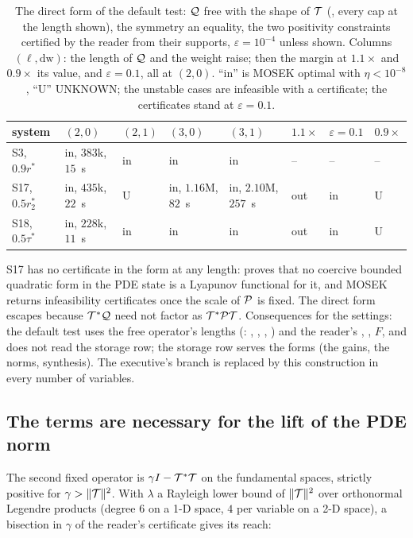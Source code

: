 \begin{table}[h]\centering\scriptsize
\setlength{\tabcolsep}{3pt}
\begin{tabular}{llllllll}
\toprule
system & $(2,0)$ & $(2,1)$ & $(3,0)$ & $(3,1)$ & $1.1\times$ & $\varepsilon=0.1$ & $0.9\times$ \\
\midrule
S3, $0.9r^*$ & in, $383$k, $15$~s & in & in & in & -- & -- & -- \\
S17, $0.5r_2^*$ & in, $435$k, $22$~s & U & in, $1.16$M, $82$~s & in, $2.10$M, $257$~s & out & in & U \\
S18, $0.5\tau^*$ & in, $228$k, $11$~s & in & in & in & out & in & U \\
\bottomrule
\end{tabular}
\caption{The direct form of the default test: $\mathcal{Q}$ free with the shape of $\mathcal{T}$ (, every cap at the length shown), the symmetry an equality, the two positivity constraints certified by the reader from their supports, $\varepsilon=10^{-4}$ unless shown. Columns $(\ell,\mathrm{dw})$: the length of $\mathcal{Q}$ and the weight raise; then the margin at $1.1\times$ and $0.9\times$ its value, and $\varepsilon=0.1$, all at $(2,0)$. ``in'' is MOSEK optimal with $\eta<10^{-8}$, ``U'' UNKNOWN; the unstable cases are infeasible with a certificate; the certificates stand at $\varepsilon=0.1$.}\label{tab:qdirect}
\end{table}

S17 has no certificate in the  form at any length:  proves that no coercive bounded quadratic form in the PDE state is a Lyapunov functional for it, and MOSEK returns infeasibility certificates once the scale of $\mathcal{P}$ is fixed. The direct form escapes because $\mathcal{T}^*\mathcal{Q}$ need not factor as $\mathcal{T}^*\mathcal{P}\mathcal{T}$. Consequences for the settings: the default test uses the free operator's lengths (: , , , ) and the reader's , , $F$, and does not read the storage row; the storage row serves the  forms (the gains, the norms, synthesis). The executive's  branch is replaced by this construction in every number of variables.

\subsection{The terms are necessary for the lift of the PDE norm}\label{sec:mixed-terms}

The second fixed operator is $\gamma I-\mathcal{T}^*\mathcal{T}$ on the fundamental spaces, strictly positive for $\gamma>\|\mathcal{T}\|^2$. With $\lambda$ a Rayleigh lower bound of $\|\mathcal{T}\|^2$ over orthonormal Legendre products (degree $6$ on a 1-D space, $4$ per variable on a 2-D space), a bisection in $\gamma$ of the reader's certificate gives its reach:

